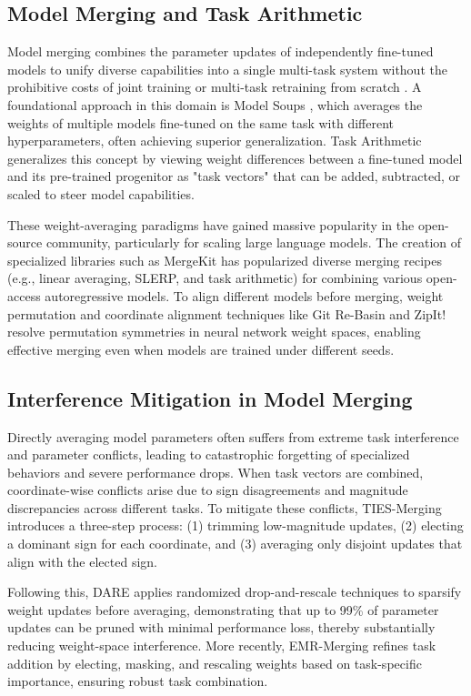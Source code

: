 \documentclass{article}
\begin{document}
\subsection{Model Merging and Task Arithmetic}
Model merging combines the parameter updates of independently fine-tuned models to unify diverse capabilities into a single multi-task system without the prohibitive costs of joint training or multi-task retraining from scratch \cite{yang2024model, li2023deep}. A foundational approach in this domain is Model Soups \cite{wortsman2022model}, which averages the weights of multiple models fine-tuned on the same task with different hyperparameters, often achieving superior generalization. Task Arithmetic \cite{ilharco2022editing} generalizes this concept by viewing weight differences between a fine-tuned model and its pre-trained progenitor as "task vectors" that can be added, subtracted, or scaled to steer model capabilities. 

These weight-averaging paradigms have gained massive popularity in the open-source community, particularly for scaling large language models. The creation of specialized libraries such as MergeKit \cite{mergekit} has popularized diverse merging recipes (e.g., linear averaging, SLERP, and task arithmetic) for combining various open-access autoregressive models. To align different models before merging, weight permutation and coordinate alignment techniques like Git Re-Basin \cite{ainsworth2023git} and ZipIt! \cite{stoica2023zipit} resolve permutation symmetries in neural network weight spaces, enabling effective merging even when models are trained under different seeds.

\subsection{Interference Mitigation in Model Merging}
Directly averaging model parameters often suffers from extreme task interference and parameter conflicts, leading to catastrophic forgetting of specialized behaviors and severe performance drops. When task vectors are combined, coordinate-wise conflicts arise due to sign disagreements and magnitude discrepancies across different tasks. To mitigate these conflicts, TIES-Merging \cite{yadav2023ties} introduces a three-step process: (1) trimming low-magnitude updates, (2) electing a dominant sign for each coordinate, and (3) averaging only disjoint updates that align with the elected sign. 

Following this, DARE \cite{yu2024language} applies randomized drop-and-rescale techniques to sparsify weight updates before averaging, demonstrating that up to 99\% of parameter updates can be pruned with minimal performance loss, thereby substantially reducing weight-space interference. More recently, EMR-Merging \cite{kang2025emr} refines task addition by electing, masking, and rescaling weights based on task-specific importance, ensuring robust task combination.
\end{document}
